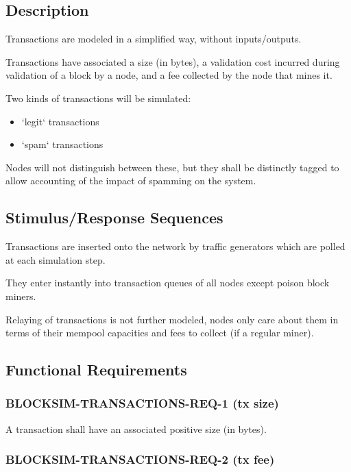\documentclass{scrreprt}
\begin{document}
    \subsection{Description}

      Transactions are modeled in a simplified way, without inputs/outputs.

      Transactions have associated a size (in bytes), a validation cost
      incurred during validation of a block by a node, and a fee collected
      by the node that mines it.

      Two kinds of transactions will be simulated:

      \begin{itemize}
        \item `legit` transactions
        \item `spam` transactions
      \end{itemize}

      Nodes will not distinguish between these, but they shall be distinctly
      tagged to allow accounting of the impact of spamming on the system.

    \subsection{Stimulus/Response Sequences}

      Transactions are inserted onto the network by traffic generators which
      are polled at each simulation step.

      They enter instantly into transaction queues of all nodes except poison
      block miners.

      Relaying of transactions is not further modeled, nodes only care about
      them in terms of their mempool capacities and fees to collect
      (if a regular miner).

    \subsection{Functional Requirements}

      \subsubsection{BLOCKSIM-TRANSACTIONS-REQ-1 (tx size)}

        A transaction shall have an associated positive size (in bytes).

      \subsubsection{BLOCKSIM-TRANSACTIONS-REQ-2 (tx fee)}
\end{document}
